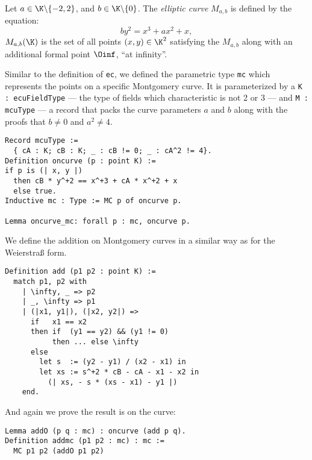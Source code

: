 \begin{dfn}
  Let $a \in \K \backslash \{-2, 2\}$, and $b \in \K \backslash \{ 0\}$.
  The \textit{elliptic curve} $M_{a,b}$ is defined by the equation:
  $$by^2 = x^3 + ax^2 + x,$$
  $M_{a,b}(\K)$ is the set of all points $(x,y) \in \K^2$ satisfying the $M_{a,b}$
  along with an additional formal point $\Oinf$, ``at infinity''.
\end{dfn}
Similar to the definition of \texttt{ec}, we defined the parametric type \texttt{mc} which
represents the points on a specific Montgomery curve.
It is parameterized by
a \texttt{K : ecuFieldType} --- the type of fields which characteristic is not
2 or 3 --- and \texttt{M : mcuType} --- a record that packs the curve
parameters $a$ and $b$ along with the proofs that $b \neq 0$ and $a^2 \neq 4$.
\begin{lstlisting}[language=Coq,belowskip=-0.1 \baselineskip]
Record mcuType :=
  { cA : K; cB : K; _ : cB != 0; _ : cA^2 != 4}.
Definition oncurve (p : point K) :=
if p is (| x, y |)
  then cB * y^+2 == x^+3 + cA * x^+2 + x
  else true.
Inductive mc : Type := MC p of oncurve p.

Lemma oncurve_mc: forall p : mc, oncurve p.
\end{lstlisting}
We define the addition on Montgomery curves in a similar way as for the Weierstra{\ss} form.
\begin{lstlisting}[language=Coq,belowskip=-0.25 \baselineskip]
Definition add (p1 p2 : point K) :=
  match p1, p2 with
    | \infty, _ => p2
    | _, \infty => p1
    | (|x1, y1|), (|x2, y2|) =>
      if   x1 == x2
      then if  (y1 == y2) && (y1 != 0)
           then ... else \infty
      else
        let s  := (y2 - y1) / (x2 - x1) in
        let xs := s^+2 * cB - cA - x1 - x2 in
          (| xs, - s * (xs - x1) - y1 |)
    end.
\end{lstlisting}
And again we prove the result is on the curve: %
\begin{lstlisting}[language=Coq]
Lemma addO (p q : mc) : oncurve (add p q).
Definition addmc (p1 p2 : mc) : mc :=
  MC p1 p2 (addO p1 p2)
\end{lstlisting}

